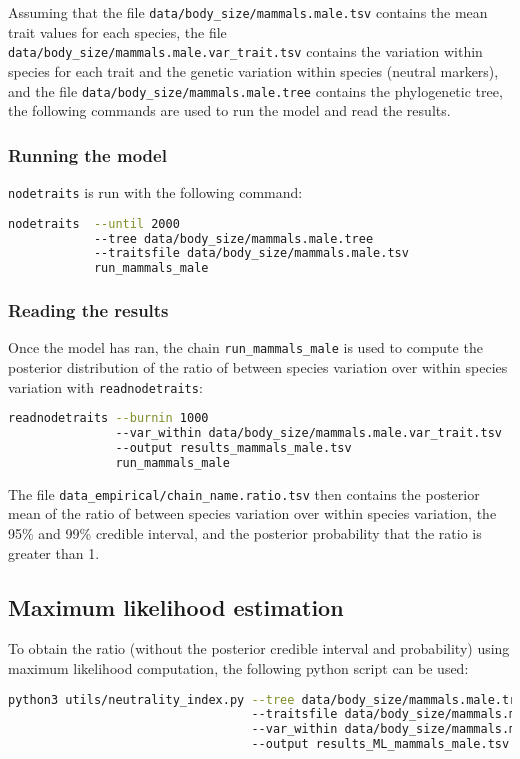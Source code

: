 \documentclass{article}
\begin{document}
Assuming that the file \texttt{data/body\_size/mammals.male.tsv} contains the mean trait values for each species, the file \texttt{data/body\_size/mammals.male.var\_trait.tsv} contains the variation within species for each trait and the genetic variation within species (neutral markers), and the file \texttt{data/body\_size/mammals.male.tree} contains the phylogenetic tree, the following commands are used to run the model and read the results.

\subsubsection{Running the model}\label{subsubsec:running-nodetraits}
\texttt{nodetraits} is run with the following command:
\begin{lstlisting}[language = sh,label={lst:nodetraits-run}]
nodetraits  --until 2000
            --tree data/body_size/mammals.male.tree
            --traitsfile data/body_size/mammals.male.tsv
            run_mammals_male
\end{lstlisting}

\subsubsection{Reading the results}\label{subsubsec:reading-the-results}
Once the model has ran, the chain \texttt{run\_mammals\_male} is used to compute the posterior distribution of the ratio of between species variation over within species variation with \texttt{readnodetraits}:
\begin{lstlisting}[language = sh,label={lst:readnodetraits-rho}]
readnodetraits --burnin 1000
               --var_within data/body_size/mammals.male.var_trait.tsv
               --output results_mammals_male.tsv
               run_mammals_male
\end{lstlisting}
The file \texttt{data\_empirical/chain\_name.ratio.tsv} then contains the posterior mean of the ratio of between species variation over within species variation, the 95\% and 99\% credible interval, and the posterior probability that the ratio is greater than 1.

\subsection{Maximum likelihood estimation}\label{subsec:maximum-likelihood-estimation}

To obtain the ratio (without the posterior credible interval and probability) using maximum likelihood computation, the following python script can be used:
\begin{lstlisting}[language = sh, label={lst:neutrality_index}]
python3 utils/neutrality_index.py --tree data/body_size/mammals.male.tree
                                  --traitsfile data/body_size/mammals.male.tsv
                                  --var_within data/body_size/mammals.male.var_trait.tsv
                                  --output results_ML_mammals_male.tsv
\end{lstlisting}
\end{document}

